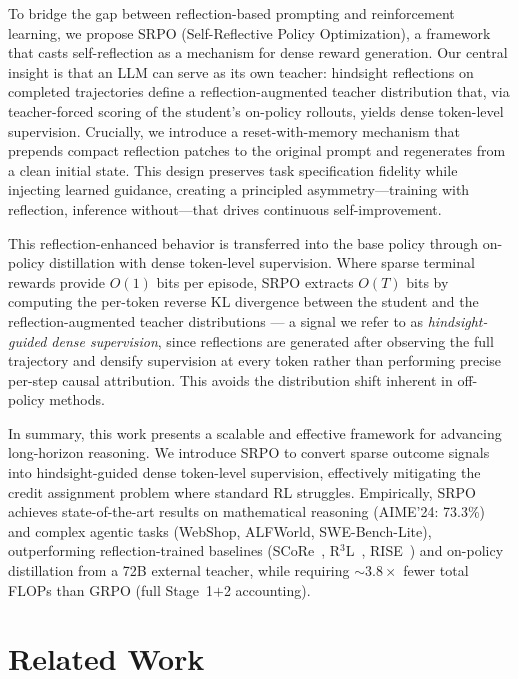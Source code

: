 \documentclass{article}
\theoremstyle{plain}
\theoremstyle{definition}
\theoremstyle{remark}
\begin{document}
To bridge the gap between reflection-based prompting and reinforcement learning, we propose SRPO (Self-Reflective Policy Optimization), 
a framework that casts self-reflection as a mechanism for dense reward generation. 
Our central insight is that an LLM can serve as its own teacher: hindsight reflections on
completed trajectories define a reflection-augmented teacher distribution that, via
teacher-forced scoring of the student's on-policy rollouts, yields dense token-level supervision.
Crucially, we introduce a reset-with-memory mechanism that prepends compact reflection patches to the original prompt and regenerates from a clean initial state. This design preserves task specification fidelity while injecting learned guidance, creating a principled asymmetry—training with reflection, inference without—that drives continuous self-improvement.

This reflection-enhanced behavior is transferred into the base policy through on-policy
distillation with dense token-level supervision. Where sparse terminal rewards provide
$O(1)$ bits per episode, SRPO extracts $O(T)$ bits by computing the per-token reverse KL
divergence between the student and the reflection-augmented teacher distributions ---
a signal we refer to as \emph{hindsight-guided dense supervision}, since reflections are
generated after observing the full trajectory and densify supervision at every token rather
than performing precise per-step causal attribution. This avoids the distribution shift
inherent in off-policy methods.

In summary, this work presents a scalable and effective framework for advancing long-horizon
reasoning. We introduce SRPO to convert sparse outcome signals into hindsight-guided dense
token-level supervision, effectively mitigating the credit assignment problem where standard
RL struggles. Empirically, SRPO achieves state-of-the-art results on mathematical reasoning
(AIME'24: 73.3\%) and complex agentic tasks (WebShop, ALFWorld, SWE-Bench-Lite),
outperforming reflection-trained baselines (SCoRe~\cite{SCoRe}, R$^3$L~\cite{r3l2026},
RISE~\cite{qu2024rise}) and on-policy distillation from a 72B external teacher, while
requiring $\sim$$3.8\times$ fewer total FLOPs than GRPO (full Stage~1$+$2 accounting).

\section{Related Work}
\label{related_work}
\end{document}
